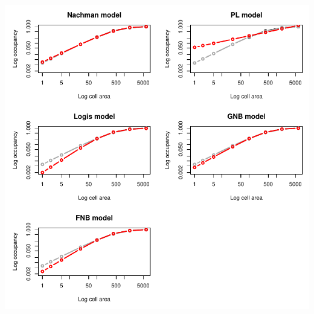 \documentclass{article}[12pt, a4paper]
\begin{document}
\includegraphics{Downscaling-downscale}
\end{document}
